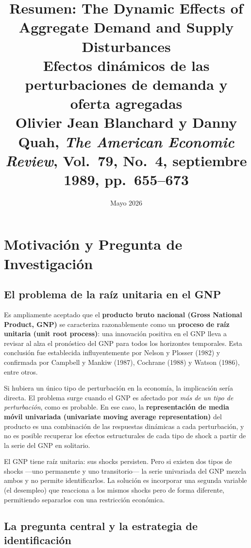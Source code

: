\documentclass[12pt]{article}
\title{\textbf{Resumen: The Dynamic Effects of Aggregate Demand and Supply Disturbances}\\[6pt]
\large Efectos din\'amicos de las perturbaciones de demanda y oferta agregadas\\[4pt]
\normalsize Olivier Jean Blanchard y Danny Quah,
\textit{The American Economic Review}, Vol.~79, No.~4, septiembre 1989, pp.~655--673}
\author{}
\date{Mayo 2026}
\begin{document}
\maketitle
\tableofcontents
\newpage

\section{Motivaci\'on y Pregunta de Investigaci\'on}

\subsection{El problema de la ra\'iz unitaria en el GNP}

Es ampliamente aceptado que el \textbf{producto bruto nacional (Gross National Product, GNP)} se caracteriza razonablemente como un \textbf{proceso de ra\'iz unitaria (unit root process)}: una innovaci\'on positiva en el GNP lleva a revisar al alza el pron\'ostico del GNP para todos los horizontes temporales. Esta conclusi\'on fue establecida influyentemente por Nelson y Plosser (1982) y confirmada por Campbell y Mankiw (1987), Cochrane (1988) y Watson (1986), entre otros.

Si hubiera un \'unico tipo de perturbaci\'on en la econom\'ia, la implicaci\'on ser\'ia directa. El problema surge cuando el GNP es afectado por \emph{m\'as de un tipo de perturbaci\'on}, como es probable. En ese caso, la \textbf{representaci\'on de media m\'ovil univariada (univariate moving average representation)} del producto es una combinaci\'on de las respuestas din\'amicas a cada perturbaci\'on, y no es posible recuperar los efectos estructurales de cada tipo de shock a partir de la serie del GNP en solitario.

\begin{intuicion}
El GNP tiene ra\'iz unitaria: sus shocks persisten. Pero si existen dos tipos de shocks ---uno permanente y uno transitorio--- la serie univariada del GNP mezcla ambos y no permite identificarlos. La soluci\'on es incorporar una segunda variable (el desempleo) que reacciona a los mismos shocks pero de forma diferente, permitiendo separarlos con una restricci\'on econ\'omica.
\end{intuicion}

\subsection{La pregunta central y la estrategia de identificaci\'on}
\end{document}
